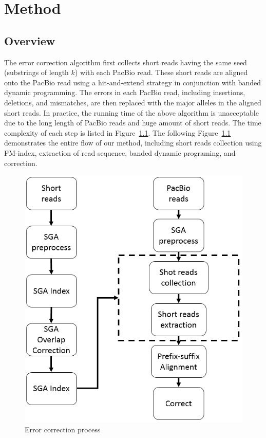 \chapter{Method}

\section{Overview}

The error correction algorithm first collects short reads having the same seed (substrings of length $k$) with each PacBio read. These short reads are aligned onto the PacBio read using a hit-and-extend strategy in conjunction with banded dynamic programming. The errors in each PacBio read, including insertions, deletions, and mismatches, are then replaced with the major alleles in the aligned short reads. In practice, the running time of the above algorithm is unacceptable due to the long length of PacBio reads and huge amount of short reads. The time complexity of each step is listed in Figure~\ref{correction_process}. The following Figure~\ref{correction_process} demonstrates the entire flow of our method, including short reads collection using FM-index, extraction of read sequence, banded dynamic programing, and correction.

\newpage %
\begin{figure}
\centering
\includegraphics[scale=0.50]{Figures/chapter3/correction_process.png}
\caption{Error correction process}
\label{correction_process}
\end{figure}


